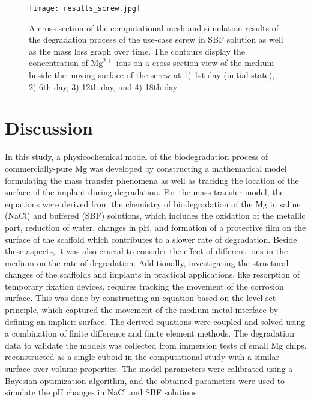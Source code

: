 \begin{figure}[t]
\centering
\medskip
\texttt{[image: results\_screw.jpg]}
\caption[Simulation results of the sample screw in the biodegradation test]{A cross-section of the computational mesh and simulation results of the degradation process of the use-case screw in \gls{SBF} solution as well as the mass loss graph over time. The contours display the concentration of $\mathrm{Mg}^{2+}$ ions on a cross-section view of the medium beside the moving surface of the screw at 1) 1st day (initial state), 2) 6th day, 3) 12th day, and 4) 18th day.} \label{fig:results_screw}
\end{figure}


\section{Discussion}

In this study, a physicochemical model of the biodegradation process of commercially-pure Mg was developed by constructing a mathematical model formulating the mass transfer phenomena as well as tracking the location of the surface of the implant during degradation. For the mass transfer model, the equations were derived from the chemistry of biodegradation of the Mg in saline (NaCl) and buffered (\gls{SBF}) solutions, which includes the oxidation of the metallic part, reduction of water, changes in pH, and formation of a protective film on the surface of the scaffold which contributes to a slower rate of degradation. Beside these aspects, it was also crucial to consider the effect of different ions in the medium on the rate of degradation. Additionally, investigating the structural changes of the scaffolds and implants in practical applications, like resorption of temporary fixation devices, requires tracking the movement of the corrosion surface. This was done by constructing an equation based on the level set principle, which captured the movement of the medium-metal interface by defining an implicit surface. The derived equations were coupled and solved using a combination of finite difference and finite element methods. The degradation data to validate the models was collected from immersion tests of small Mg chips, reconstructed as a single cuboid in the computational study with a similar surface over volume properties. The model parameters were calibrated using a Bayesian optimization algorithm, and the obtained parameters were used to simulate the pH changes in NaCl and \gls{SBF} solutions.

